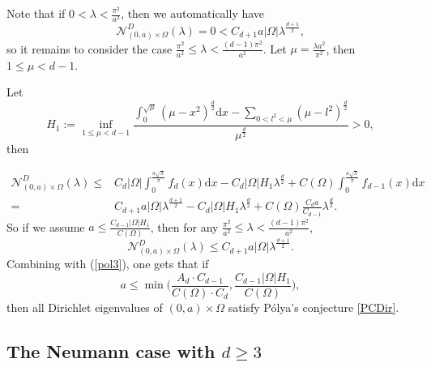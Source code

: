 \documentclass[11pt,letterpaper]{amsart}
\numberwithin{equation}{section}
\theoremstyle{plain}
\theoremstyle{plain}
\numberwithin{equation}{section}
\theoremstyle{remark}
\begin{document}
	Note that if $0< \lambda< \frac{\pi^2}{a^2}$, then we automatically have 
	\[
	\mathcal N^D_{(0,a)\times \Omega}(\lambda)=0< C_{d+1}a|\Omega|\lambda^{\frac{d+1}{2}},
	\] 
	so it remains to consider the case $\frac{\pi^2}{a^2}\le \lambda< \frac{(d-1)\pi^2}{a^2}$. Let $\mu= \frac{\lambda a^2}{\pi^2}$, then $1\le \mu< d-1$.

	Let 
	\[
	H_1:= \inf_{1\le \mu< d-1} \frac{\int^{\sqrt\mu}_0 (\mu- x^2)^{\frac{d}{2}} \mathrm{d}x- \sum_{0<l^2< \mu} (\mu- l^2)^{\frac{d}{2}}}{\mu^{\frac{d}{2}}}>0,
	\]
	then

	\[
	\begin{aligned}
		\mathcal N^D_{(0,a)\times \Omega}(\lambda) 
		\le& C_d|\Omega|\int_0^{{\frac{a\sqrt\lambda}{\pi}}} f_d(x)\mathrm{d}x -C_d|\Omega|H_1 \lambda^{\frac{d}{2}}+C(\Omega)\int_0^{{\frac{a\sqrt\lambda}{\pi}}} f_{d-1}(x)\mathrm{d}x\\
		=  & C_{d+1}a|\Omega|\lambda^{\frac{d+1}{2}}-C_d|\Omega|H_1 \lambda^{\frac{d}{2}}+C(\Omega)\frac{C_da}{C_{d-1}}\lambda^{\frac{d}{2}}.
	\end{aligned}
	\]
	So if we assume $a\le \frac{C_{d-1}|\Omega| H_1}{C(\Omega)}$, then for any $\frac{\pi^2}{a^2}\le \lambda< \frac{(d-1)\pi^2}{a^2}$,  
	\[
	\mathcal N^D_{(0,a)\times \Omega}(\lambda)\le C_{d+1}a|\Omega|\lambda^{\frac{d+1}{2}}.
	\]
	Combining  with (\ref{pol3}), one gets that if 
	\[
	a\le \min\bigg(\frac{A_d\cdot C_{d-1}}{C(\Omega)\cdot C_d}, \frac{C_{d-1}|\Omega| H_1}{C(\Omega)}\bigg),
	\] 
	then all Dirichlet eigenvalues of $(0,a)\times \Omega$ satisfy  P\'olya's conjecture \eqref{PCDir}. 
	
	
	\subsection{The Neumann case with $d\ge 3$}\label{Neud3}
	
\end{document}
